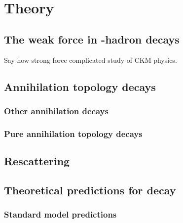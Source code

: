 \chapter{Theory} 
\label{ch:theory}

\minitoc





\section{The weak force in \bquark-hadron decays}
Say how strong force complicated study of CKM physics.

\section{Annihilation topology decays}
\subsection{Other annihilation decays}
\subsection{Pure annihilation topology decays}


\section{Rescattering}



\section{Theoretical predictions for \decay{\Bp}{\Dsp\phiz} decay}
\subsection{Standard model predictions}
